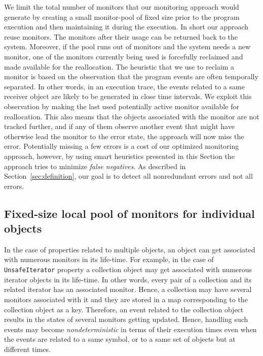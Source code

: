 We limit the total number of 
monitors that our monitoring approach would generate by creating a small 
monitor-pool of fixed size prior to the program execution and then maintaining 
it during the execution. In short our approach reuse monitors. The monitors 
after their usage can be returned back to the system. Moreover, if the pool runs 
out of monitors and the system needs a new monitor, one of the monitors currently being 
used is forcefully reclaimed and made available for the reallocation. The 
heuristic that we use to reclaim a monitor is based on the observation that the 
program events are often temporally separated. In other words, in an execution 
trace, the events related to a same receiver object are likely to be generated 
in close time intervals. We exploit this observation by making the last used potentially active 
monitor available for reallocation. This also means that the objects associated with the monitor
are not tracked further, and if any of them observe another event that might have otherwise
lead the monitor to the error state, the approach will now miss the error. 
Potentially missing a few errors is a cost of our optimized monitoring approach, 
however, by using smart heuristics presented in this Section the approach tries to
minimize \textit{false negatives}. As described in Section~\ref{sec:definition}, our
goal is to detect all nonredundant errors and not all errors.

\subsection{Fixed-size local pool of monitors for individual objects}

In the case of properties related to multiple objects, 
an object can get associated with numerous monitors in its life-time. For example,
in the case of \texttt{UnsafeIterator} property a collection object may get associated
with numerous iterator objects in its life-time. In other words, every pair of a collection and its related
iterator has an associated monitor. Hence, a collection may have several monitors associated with it
and they are stored in a map corresponding to the collection object as a key.
Therefore, an event related to the collection object results in the states of 
several monitors getting updated. Hence, handling such events may become 
\textit{nondeterministic} in terms of their execution times even when the events are related
to a same symbol, or to a same set of objects but at different times.

